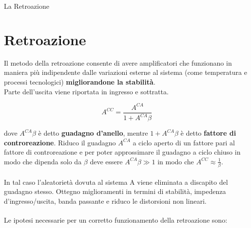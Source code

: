 \documentclass[a4paper, 12pt]{book}
\begin{document}
\begin{titlepage}
    \begin{center}
        \LARGE{La Retroazione}
    \end{center}
\end{titlepage}

\tableofcontents

\chapter{Retroazione}
Il metodo della retroazione consente di avere amplificatori che funzionano in maniera più indipendente 
dalle variazioni esterne al sistema (come temperatura e processi tecnologici) \textbf{migliorandone la stabilità}.
\\Parte dell'uscita viene riportata in ingresso e sottratta.

\begin{equation*}
    A^{CC} = \frac{A^{CA}}{1+A^{CA}\beta}
\end{equation*}

dove $A^{CA}\beta$ è detto \textbf{guadagno d'anello}, mentre $1+A^{CA}\beta$ è detto \textbf{fattore di controreazione}.
Riduco il guadagno $A^{CA}$ a ciclo aperto di un fattore pari al fattore di controreazione e per poter approssimare il guadagno a ciclo
chiuso in modo che dipenda solo da $\beta$ deve essere $A^{CA}\beta\gg1$ in modo che $A^{CC}\approx\frac{1}{\beta}$.
\\\\In tal caso l'aleatorietà dovuta al sistema A viene eliminata a discapito del guadagno stesso. Ottegno miglioramenti in termini di stabilità,
impedenza d'ingresso/uscita, banda passante e riduco le distorsioni non lineari.
\\\\Le ipotesi necessarie per un corretto funzionamento della retroazione sono:
\end{document}
